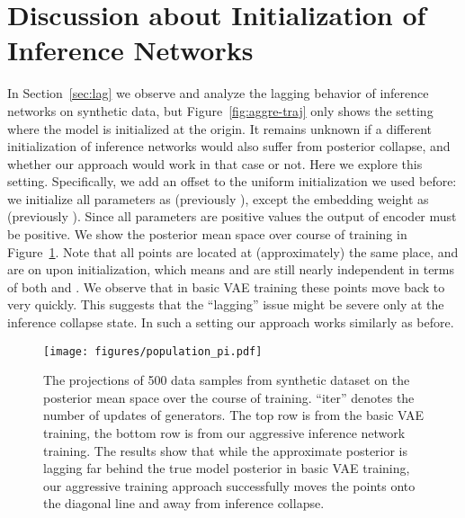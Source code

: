 \documentclass{article} \usepackage{iclr2019_conference,times}
\begin{document}
\section{Discussion about Initialization of Inference Networks}\label{apdix:enc-init}
In Section~\ref{sec:lag} we observe and analyze the lagging behavior of inference networks on synthetic data, but Figure~\ref{fig:aggre-traj} only shows the setting where the model is initialized at the origin. It remains unknown if a different initialization of inference networks would also suffer from posterior collapse, and whether our approach would work in that case or not. Here we explore this setting. Specifically, we add an offset to the uniform initialization we used before: we initialize all parameters as  (previously ), except the embedding weight as  (previously ). Since all parameters are positive values the output of encoder must be positive. We show the posterior mean space over course of training in Figure~\ref{fig:apdix-aggre-traj}. Note that all points are located at (approximately) the same place, and are on  upon initialization, which means  and  are still nearly independent in terms of both  and . We observe that in basic VAE training these points move back to  very quickly. This suggests that the ``lagging'' issue might be severe only at the inference collapse state. In such a setting our approach works similarly as before.
 
\begin{figure}[h]
\centering
	 \texttt{[image: figures/population\_pi.pdf]}
	 \vspace{-15pt}
	 \caption{The projections of 500 data samples from synthetic dataset on the posterior mean space over the course of training. ``iter'' denotes the number of updates of generators. The top row is from the basic VAE training, the bottom row is from our aggressive inference network training. The results show that while the approximate posterior is lagging far behind the true model posterior in basic VAE training, our aggressive training approach successfully moves the points onto the diagonal line and away from inference collapse.}
	\label{fig:apdix-aggre-traj}
	\vspace{-10pt}
\end{figure}
\end{document}
